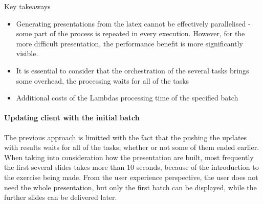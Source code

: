 
Key takeaways

\begin{itemize}
    \item Generating presentations from the latex cannot be effectively parallelised - some part of the process is repeated in every execution. However, for the more difficult presentation, the performance benefit is more significantly visible.
    \item It is essential to consider that the orchestration of the several tasks brings some overhead, the processing waits for all of the tasks
    \item Additional costs of the Lambdas processing time of the specified batch
\end{itemize}

\paragraph{Updating client with the initial batch}

The previous approach is limitted with the fact that the pushing the updates with results waits for all of the tasks, whether or not some of them ended earlier. When taking into consideration how the presentation are built, most frequently the first several slides takes more than 10 seconds, because of the introduction to the exercise being made. From the user experience perspective, the user does not need the whole presentation, but only the first batch can be displayed, while the further slides can be delivered later.

